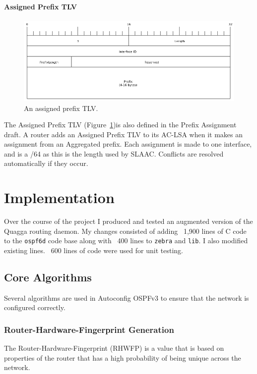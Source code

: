 \documentclass[12pt,a4paper,twoside]{report}
\begin{document}
\subsubsection{Assigned Prefix TLV}
\begin{figure}
\begin{center}
	\includegraphics[width=\linewidth]{../Diagrams/Packets/assigned_prefix_tlv.png}
	\caption{An assigned prefix TLV.}\label{fig:AssignedPrefix-TLV}
\end{center}
\end{figure}
The Assigned Prefix TLV (Figure~\ref{fig:AssignedPrefix-TLV})is also defined in
the Prefix Assignment draft. A router adds an Assigned Prefix TLV to its AC-LSA
when it makes an assignment from an Aggregated prefix. Each assignment is made
to one interface, and is a /64 as this is the length used by SLAAC\@. Conflicts
are resolved automatically if they occur. 

\chapter{Implementation}
Over the course of the project I produced and tested an augmented version of
the Quagga routing daemon. My changes consisted of adding ~1,900 lines of C
code to the \texttt{ospf6d} code base along with ~400 lines to \texttt{zebra} and
\texttt{lib}. I also modified existing lines. ~600 lines of code were
used for unit testing.

\section{Core Algorithms}
Several algorithms are used in Autoconfig OSPFv3 to ensure that the network
is configured correctly.

\subsection{Router-Hardware-Fingerprint Generation}
The Router-Hardware-Fingerprint (RHWFP) is a value that is based on properties of
the router that has a high probability of being unique across the network. 
\end{document}
